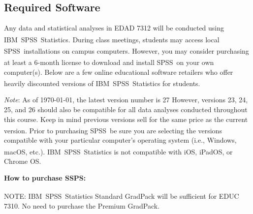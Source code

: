 \documentclass[
]{article}
\begin{document}
\subsection{Required Software}

Any data and statistical analyses in EDAD 7312 will be conducted using
IBM\textsuperscript{\textregistered}~SPSS\textsuperscript{\textregistered}~Statistics.
During class meetings, students may access local
SPSS\textsuperscript{\textregistered}~installations on campus computers.
However, you may consider purchasing at least a 6-month license to
download and install SPSS\textsuperscript{\textregistered}~on your own
computer(s). Below are a few online educational software retailers who
offer heavily discounted versions of
IBM\textsuperscript{\textregistered}~SPSS\textsuperscript{\textregistered}~Statistics
for students.

\emph{Note}: As of \today, the latest version number is 27 However,
versions 23, 24, 25, and 26 should also be compatible for all data
analyses conducted throughout this course. Keep in mind previous
versions sell for the same price as the current version. Prior to
purchasing SPSS\textsuperscript{\textregistered}~be sure you are
selecting the versions compatible with your particular computer's
operating system (i.e., Windows, macOS, etc.).
IBM\textsuperscript{\textregistered}~SPSS\textsuperscript{\textregistered}~Statistics
is not compatible with iOS, iPadOS, or Chrome OS.

\textbf{How to purchase SSPS:}

\begin{tcolorbox}
[width=\linewidth, sharp corners=all, colback=white!95!red]
NOTE: IBM\textsuperscript{\textregistered}\ SPSS\textsuperscript{\textregistered}\ Statistics Standard GradPack will be sufficient for EDUC 7310. No need to purchase the Premium GradPack.
\end{tcolorbox}
\end{document}
